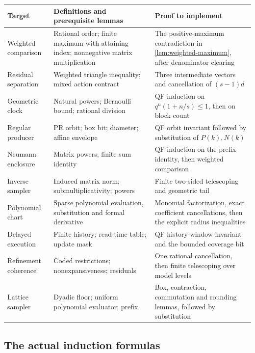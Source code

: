 \begin{longtable}{@{}>{\raggedright\arraybackslash}p{}>{\raggedright\arraybackslash}p{}>{\raggedright\arraybackslash}p{}@{}}
\toprule
Target & Definitions and prerequisite lemmas & Proof to implement\\
\midrule
\endhead
Weighted comparison & Rational order; finite maximum with attaining index;
nonnegative matrix multiplication & The positive-maximum contradiction in
\cref{lem:weighted-maximum}, after denominator clearing\\
Residual separation & Weighted triangle inequality; mixed action contract &
Three intermediate vectors and cancellation of \((s-1)d\)\\
Geometric clock & Natural powers; Bernoulli bound; rational division &
QF induction on \(q^n(1+n/s)\le1\), then on block count\\
Regular producer & PR orbit; box bit; diameter; affine envelope &
QF orbit invariant followed by substitution of \(P(k),N(k)\)\\
Neumann enclosure & Matrix powers; finite sum identity &
QF induction on the prefix identity, then weighted comparison\\
Inverse sampler & Induced matrix norm; submultiplicativity; powers &
Finite two-sided telescoping and geometric tail\\
Polynomial chart & Sparse polynomial evaluation, substitution and
formal derivative & Monomial factorization, exact coefficient cancellations,
then the explicit radius inequalities\\
Delayed execution & Finite history; read-time table; update mask &
QF history-window invariant and the bounded coverage bit\\
Refinement coherence & Coded restrictions; nonexpansiveness; residuals &
One rational cancellation, then finite telescoping over model levels\\
Lattice sampler & Dyadic floor; uniform polynomial evaluator; prefix &
Box, contraction, commutation and rounding lemmas, followed by substitution\\
\bottomrule
\end{longtable}

\subsection{The actual induction formulas}

